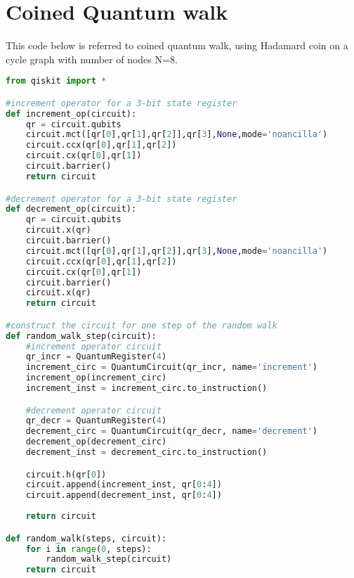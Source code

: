 \section{Coined Quantum walk}
This code below is referred to coined quantum walk, using Hadamard coin on a
cycle graph with number of nodes N=8.

\begin{lstlisting}[breaklines,language=Python,basicstyle=\tiny]
from qiskit import *

#increment operator for a 3-bit state register
def increment_op(circuit):
    qr = circuit.qubits
    circuit.mct([qr[0],qr[1],qr[2]],qr[3],None,mode='noancilla')
    circuit.ccx(qr[0],qr[1],qr[2])
    circuit.cx(qr[0],qr[1])
    circuit.barrier()
    return circuit

#decrement operator for a 3-bit state register
def decrement_op(circuit):
    qr = circuit.qubits
    circuit.x(qr)   
    circuit.barrier()
    circuit.mct([qr[0],qr[1],qr[2]],qr[3],None,mode='noancilla')
    circuit.ccx(qr[0],qr[1],qr[2])
    circuit.cx(qr[0],qr[1])
    circuit.barrier()
    circuit.x(qr)
    return circuit

#construct the circuit for one step of the random walk
def random_walk_step(circuit):
    #increment operator circuit
    qr_incr = QuantumRegister(4)
    increment_circ = QuantumCircuit(qr_incr, name='increment')
    increment_op(increment_circ)
    increment_inst = increment_circ.to_instruction()

    #decrement operator circuit
    qr_decr = QuantumRegister(4)
    decrement_circ = QuantumCircuit(qr_decr, name='decrement')
    decrement_op(decrement_circ)
    decrement_inst = decrement_circ.to_instruction()

    circuit.h(qr[0])
    circuit.append(increment_inst, qr[0:4])
    circuit.append(decrement_inst, qr[0:4])
    
    return circuit   

def random_walk(steps, circuit):
    for i in range(0, steps):
        random_walk_step(circuit)
    return circuit  
\end{lstlisting}

\clearpage

